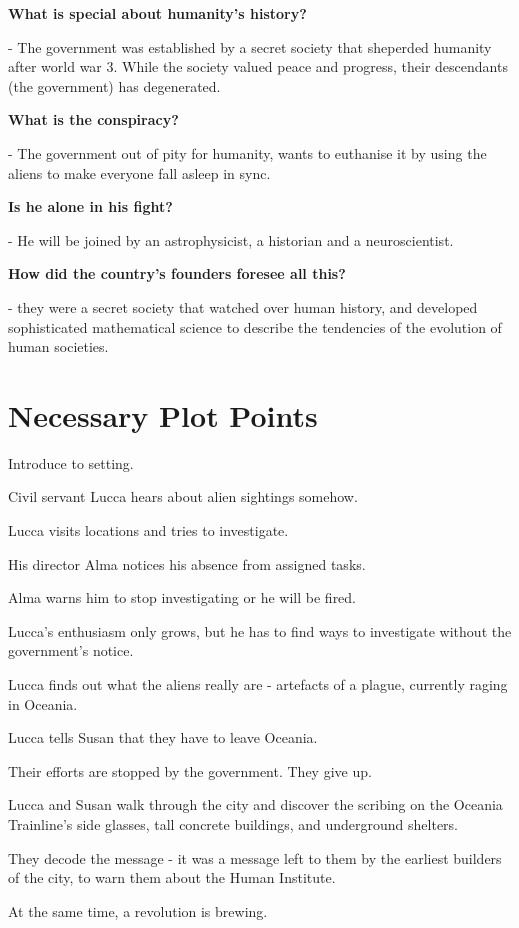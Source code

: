 \documentclass[11pt]{article}
\begin{document}
\textbf{What is special about humanity's history?}

- The government was established by a secret society that sheperded humanity after world war 3. While the society valued peace and progress, their descendants (the government) has degenerated. 


\textbf{What is the conspiracy?}

- The government out of pity for humanity, wants to euthanise it by using the aliens to make everyone fall asleep in sync.


\textbf{Is he alone in his fight?}

- He will be joined by an astrophysicist, a historian and a neuroscientist.


\textbf{How did the country's founders foresee all this?}

- they were a secret society that watched over human history, and developed sophisticated mathematical science to describe the tendencies of the evolution of human societies.


\section{Necessary Plot Points}
Introduce to setting.

Civil servant Lucca hears about alien sightings somehow.

Lucca visits locations and tries to investigate. 

His director Alma notices his absence from assigned tasks.

Alma warns him to stop investigating or he will be fired.

Lucca's enthusiasm only grows, but he has to find ways to investigate without the government's notice.





Lucca finds out what the aliens really are - artefacts of a plague, currently raging in Oceania.

Lucca tells Susan that they have to leave Oceania.

Their efforts are stopped by the government. They give up.




Lucca and Susan walk through the city and discover the scribing on the Oceania Trainline's side glasses, tall concrete buildings, and underground shelters. 

They decode the message - it was a message left to them by the earliest builders of the city, to warn them about the Human Institute. 

At the same time, a revolution is brewing. 









\newpage


	
\end{document}

